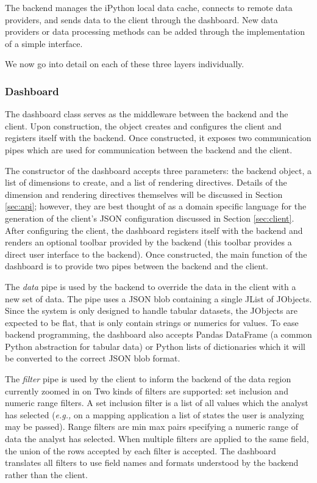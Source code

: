 \documentclass[letter,twocolumn]{article}
\begin{document}
The backend manages the iPython local data cache, connects to remote data providers, and sends data to the client through the dashboard.
New data providers or data processing methods can be added through the implementation of a simple interface.

We now go into detail on each of these three layers individually.

\subsubsection{Dashboard}\label{sec:dashboard}

The dashboard class serves as the middleware between the backend and the client.
Upon construction, the object creates and configures the client and registers itself with the backend.
Once constructed, it exposes two communication pipes which are used for communication between the backend and the client.

The constructor of the dashboard accepts three parameters: the backend object, a list of dimensions to create, and a list of rendering directives.
Details of the dimension and rendering directives themselves will be discussed in Section \ref{sec:api}; however, they are best thought of as a domain specific language for the generation of the client's JSON configuration discussed in Section \ref{sec:client}.
After configuring the client, the dashboard registers itself with the backend and renders an optional toolbar provided by the backend (this toolbar provides a direct user interface to the backend).
Once constructed, the main function of the dashboard is to provide two pipes between the backend and the client.

The \emph{data} pipe is used by the backend to override the data in the client with a new set of data.  
The pipe uses a JSON blob containing a single JList of JObjects.
Since the system is only designed to handle tabular datasets, the JObjects are expected to be flat, that is only contain strings or numerics for values.
To ease backend programming, the dashboard also accepts Pandas DataFrame (a common Python abstraction for tabular data) or Python lists of dictionaries which it will be converted to the correct JSON blob format.

The \emph{filter} pipe is used by the client to inform the backend of the data region currently zoomed in on 
Two kinds of filters are supported: set inclusion and numeric range filters.
A set inclusion filter is a list of all values which the analyst has selected (\emph{e.g.,} on a mapping application a list of states the user is analyzing may be passed).
Range filters are min max pairs specifying a numeric range of data the analyst has selected.
When multiple filters are applied to the same field, the union of the rows accepted by each filter is accepted.
The dashboard translates all filters to use field names and formats understood by the backend rather than the client.
\end{document}

